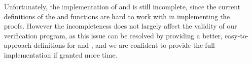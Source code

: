 Unfortunately, the implementation of  and  is still incomplete, since the current definitions of the  and  functions are hard to work with in implementing the proofs. However the incompleteness does not largely affect the validity of our verification program, as this issue can be resolved by providing a better, easy-to-approach definitions for  and , and we are confident to provide the full implementation if granted more time. 
\\






